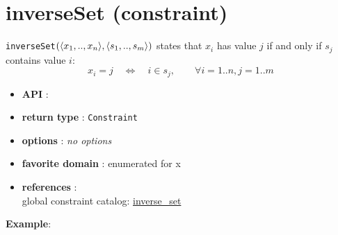 \label{inverseset}
\hypertarget{inverseset}{}

\section{inverseSet (constraint)}\label{inverseset:inversesetconstraint}\hypertarget{inverseset:inversesetconstraint}{}
\begin{notedef}
  \texttt{inverseSet}$(\langle x_1,..,x_n\rangle,\langle s_1,..,s_m\rangle)$ states 
that $x_i$ has value $j$ if and only if $s_j$ contains value $i$:
$$x_i = j\quad\iff\quad i\in s_j,\qquad\forall i=1..n,j=1..m$$
\end{notedef}
\begin{itemize}
	\item \textbf{API} : 
	\item \textbf{return type} : \texttt{Constraint}
	\item \textbf{options} : \emph{no options}
	\item \textbf{favorite domain} : enumerated for x
	\item \textbf{references} :\\
      global constraint catalog: \href{http://www.emn.fr/x-info/sdemasse/gccat/Cinverse_set.html}{inverse\_set}
\end{itemize}

\textbf{Example}:

